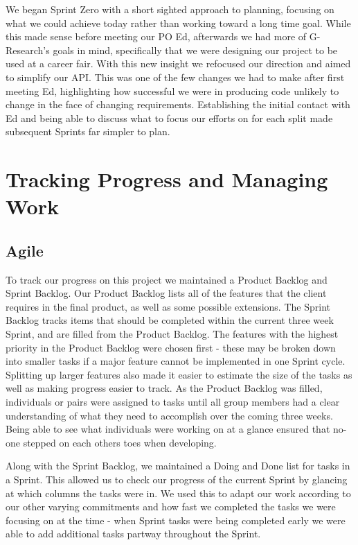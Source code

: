 We began Sprint Zero with a short sighted approach to planning, focusing on what we could achieve today rather than working toward a long time goal. While this made sense before meeting our PO Ed, afterwards we had more of G-Research's goals in mind, specifically that we were designing our project to be used at a career fair. With this new insight we refocused our direction and aimed to simplify our API. This was one of the few changes we had to make after first meeting Ed, highlighting how successful we were in producing code unlikely to change in the face of changing requirements. Establishing the initial contact with Ed and being able to discuss what to focus our efforts on for each split made subsequent Sprints far simpler to plan.

\section{Tracking Progress and Managing Work}

\subsection{Agile}
To track our progress on this project we maintained a Product Backlog and Sprint Backlog. Our Product Backlog lists all of the features that the client requires in the final product, as well as some possible extensions. The Sprint Backlog tracks items that should be completed within the current three week Sprint, and are filled from the Product Backlog. The features with the highest priority in the Product Backlog were chosen first - these may be broken down into smaller tasks if a major feature cannot be implemented in one Sprint cycle. Splitting up larger features also made it easier to estimate the size of the tasks as well as making progress easier to track. As the Product Backlog was filled, individuals or pairs were assigned to tasks until all group members had a clear understanding of what they need to accomplish over the coming three weeks. Being able to see what individuals were working on at a glance ensured that no-one stepped on each others toes when developing.

Along with the Sprint Backlog, we maintained a Doing and Done list for tasks in a Sprint. This allowed us to check our progress of the current Sprint by glancing at which columns the tasks were in. We used this to adapt our work according to our other varying commitments and how fast we completed the tasks we were focusing on at the time - when Sprint tasks were being completed early we were able to add additional tasks partway throughout the Sprint.

